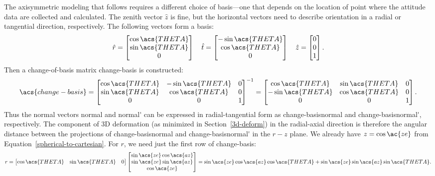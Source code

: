 The axisymmetric modeling that follows requires a different choice of basis---one that depends on the location of point where the attitude data are collected and calculated. The zenith vector $\hat z$ is fine, but the horizontal vectors need to describe orientation in a radial or tangential direction, respectively. The following vectors form a basis:
\begin{equation}
    \hat r = \begin{bmatrix}
        \cos\acs{THETA}\\\sin\acs{THETA}\\0
    \end{bmatrix}\quad
    \hat t = \begin{bmatrix}
        -\sin\acs{THETA}\\\cos\acs{THETA}\\0
    \end{bmatrix}\quad
    \hat z = \begin{bmatrix}
        0\\0\\1
    \end{bmatrix}.
\end{equation}
Then a change-of-basis matrix \acs{change-basis} is constructed:
\begin{equation}
    \acs{change-basis}=\begin{bmatrix}
        \cos\acs{THETA} & -\sin\acs{THETA} & 0\\
        \sin\acs{THETA} & \cos\acs{THETA} & 0\\
        0 & 0 & 1
    \end{bmatrix}^{-1}=\begin{bmatrix}
        \cos\acs{THETA} & \sin\acs{THETA} & 0\\
        -\sin\acs{THETA} & \cos\acs{THETA} & 0\\
        0 & 0 & 1
    \end{bmatrix}.
\end{equation}
Thus the normal vectors \acs{normal} and \acs{normal'} can be expressed in radial-tangential form as \acs{change-basis}\acs{normal} and \acs{change-basis}\acs{normal'}, respectively. The component of 3D deformation (as minimized in Section~\ref{3d-deform}) in the radial-axial direction is therefore the angular distance between the projections of \acs{change-basis}\acs{normal} and \acs{change-basis}\acs{normal'} in the $r-z$ plane. We already have $z=\cos\ac{ze}$ from Equation~\ref{spherical-to-cartesian}. For $r$, we need just the first row of \acs{change-basis}:
\begin{equation}
    r=
    \begin{bmatrix}
        \cos\acs{THETA} & \sin\acs{THETA} & 0
    \end{bmatrix}\begin{bmatrix}
        \sin\acs{ze}\cos\acs{az}\\
        \sin\acs{ze}\sin\acs{az}\\
        \cos\acs{ze}
    \end{bmatrix}
    =\sin\acs{ze}\cos\acs{az}\cos\acs{THETA}+\sin\acs{ze}\sin\acs{az}\sin\acs{THETA}.
\end{equation}
